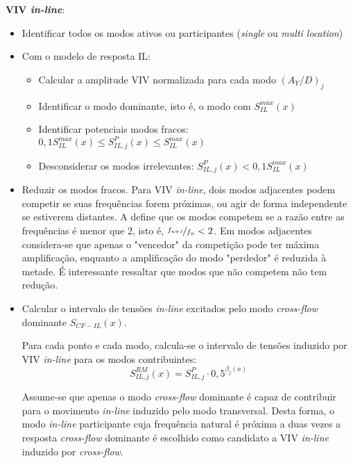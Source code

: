 \textbf{VIV \textit{in-line}}:
\begin{itemize}
\item Identificar todos os modos ativos ou participantes (\textit{single} ou \textit{multi location})
\item Com o modelo de resposta IL:
\begin{itemize}
	\item Calcular a amplitude VIV normalizada para cada modo $(A_Y/D)_j$
	
	\item Identificar o modo dominante, isto é, o modo com $S_\mathit{IL}^\mathit{max}(x)$
	
	\item Identificar potenciais modos fracos: $0,1 S_\mathit{IL}^\mathit{max}(x) \leq S_{\mathit{IL}, \mathit{j}}^{P}(x) \leq S_\mathit{IL}^\mathit{max}(x)$
	
	\item Desconsiderar os modos irrelevantes: $S_{\mathit{IL}, \mathit{j}}^{P}(x) < 0,1 S_\mathit{IL}^\mathit{max}(x)$
\end{itemize}
\item Reduzir os modos fracos. Para VIV \textit{in-line}, dois modos adjacentes podem competir se suas frequências forem próximas, ou agir de forma independente se estiverem distantes. A  define que os modos competem se a razão entre as frequências é menor que 2, isto é, $\nicefrac{f_\mathit{n+1}}{f_n} < 2$. Em modos adjacentes considera-se que apenas o "vencedor" da competição pode ter máxima amplificação, enquanto a amplificação do modo "perdedor" é reduzida à metade. É interessante ressaltar que modos que não competem não tem redução.

\item Calcular o intervalo de tensões \textit{in-line} excitados pelo modo \textit{cross-flow} dominante $S_{\mathit{CF}-\mathit{IL}}(x)$.

Para cada ponto e cada modo, calcula-se o intervalo de tensões induzido por VIV \textit{in-line} para os modos contribuintes:
		\[S_{\mathit{IL}, \mathit{j}}^\mathit{RM}(x) = S_{\mathit{IL}, \mathit{j}}^{P} \cdot 0,5^{\beta_j (x)}\]	

Assume-se que apenas o modo \textit{cross-flow} dominante é capaz de contribuir para o movimento \textit{in-line} induzido pelo modo transversal. Desta forma, o modo \textit{in-line} participante cuja frequência natural é próxima a duas vezes a resposta \textit{cross-flow} dominante é escolhido como candidato a VIV \textit{in-line} induzido por \textit{cross-flow}.


\end{itemize}
